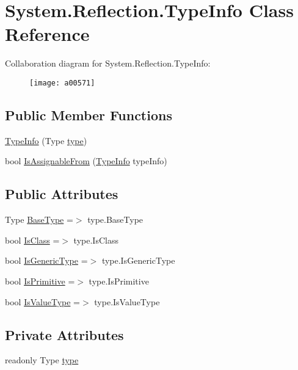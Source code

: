 \hypertarget{a00171}{\section{System.\-Reflection.\-Type\-Info Class Reference}
\label{a00171}
}


Collaboration diagram for System.\-Reflection.\-Type\-Info\-:
\nopagebreak
\begin{figure}[H]
\begin{center}
\leavevmode
\texttt{[image: a00571]}
\end{center}
\end{figure}
\subsection*{Public Member Functions}
\begin{DoxyCompactItemize}
\item 
\hyperlink{a00171_ae2bbf4462c274977b6df5c994808cc39}{Type\-Info} (Type \hyperlink{a00171_a71c4f4b000d08808c8965222d4ba1b8d}{type})
\item 
bool \hyperlink{a00171_a8c74647f572e998dd7e843a752d5234d}{Is\-Assignable\-From} (\hyperlink{a00171}{Type\-Info} type\-Info)
\end{DoxyCompactItemize}
\subsection*{Public Attributes}
\begin{DoxyCompactItemize}
\item 
Type \hyperlink{a00171_a8bb78c2b0377f57dba1a3e2031216029}{Base\-Type} =$>$ type.\-Base\-Type
\item 
bool \hyperlink{a00171_a6ae2d0f4c557010a075a6fecab18fbb5}{Is\-Class} =$>$ type.\-Is\-Class
\item 
bool \hyperlink{a00171_a6a532f6a581b3280d1837fc242f314af}{Is\-Generic\-Type} =$>$ type.\-Is\-Generic\-Type
\item 
bool \hyperlink{a00171_ab38ba26ebc21ec6fb908b74eede99a5c}{Is\-Primitive} =$>$ type.\-Is\-Primitive
\item 
bool \hyperlink{a00171_ae2255904b8743c47a185d62909404aed}{Is\-Value\-Type} =$>$ type.\-Is\-Value\-Type
\end{DoxyCompactItemize}
\subsection*{Private Attributes}
\begin{DoxyCompactItemize}
\item 
readonly Type \hyperlink{a00171_a71c4f4b000d08808c8965222d4ba1b8d}{type}
\end{DoxyCompactItemize}


